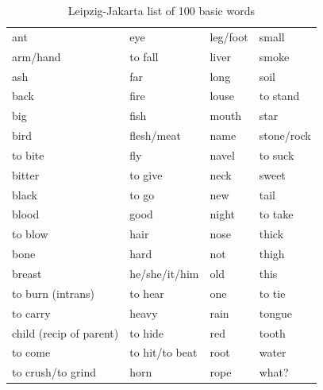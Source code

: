 \documentclass[output=paper]{LSP/langsci}
\begin{document}
\begin{table}
\caption{Leipzig-Jakarta list of 100 basic words \citet{HaspelmathTadmor2009}} \label{LJ100}
\begin{tabular}{llll}    
\lsptoprule                                                                     
 ant                     &    eye                     &       leg/foot         &    small  \\
 arm/hand                &    to fall                 &       liver           &      smoke     \\
 ash                     &    far                     &       long            &     soil      \\
 back                    &    fire                    &       louse           &     to stand  \\
 big                     &    fish                    &       mouth           &     star         \\
 bird                    &    flesh/meat              &       name            &     stone/rock\\
 to bite                 &    fly                     &       navel           &     to suck\\
 bitter                  &    to give                 &       neck            &     sweet \\
 black                   &    to go                   &       new             &     tail \\
 blood                   &    good                    &       night           &     to take\\
 to blow                 &    hair                    &       nose            &     thick \\
 bone                    &    hard                    &       not             &     thigh \\
 breast                  &    he/she/it/him           &       old             &     this \\
 to burn (intrans)       &    to hear                 &         one            &      to tie\\
 to carry                &    heavy                   &       rain            &     tongue \\
 child (recip of parent) &     to hide                &         red           &      tooth\\
 to come                 &      to hit/to beat        &         root          &      water\\
 to crush/to grind       &     horn                   &         rope          &      what?\\

\end{tabular}
\end{table}
\end{document}
